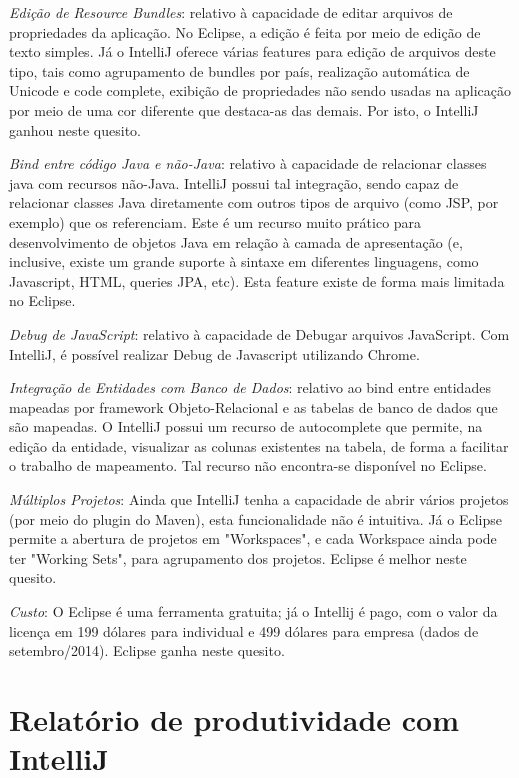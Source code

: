 \documentclass[12pt,journal,compsoc]{IEEEtran}
\begin{document}
\emph{Edição de Resource Bundles}: relativo à capacidade de editar arquivos de propriedades da aplicação. No Eclipse, a edição é feita por meio de edição de texto simples. Já o IntelliJ oferece várias features para edição de arquivos deste tipo, tais como agrupamento de bundles por país, realização automática de Unicode e code complete, exibição de propriedades não sendo usadas na aplicação por meio de uma cor diferente que destaca-as das demais. Por isto, o IntelliJ ganhou neste quesito.

\emph{Bind entre código Java e não-Java}: relativo à capacidade de relacionar classes java com recursos não-Java. IntelliJ possui tal integração, sendo capaz de relacionar classes Java diretamente com outros tipos de arquivo (como JSP, por exemplo) que os referenciam. Este é um recurso muito prático para desenvolvimento de objetos Java em relação à camada de apresentação (e, inclusive, existe um grande suporte à sintaxe em diferentes linguagens, como Javascript, HTML, queries JPA, etc\cite{dropped_eclipse}). Esta feature existe de forma mais limitada no Eclipse.

\emph{Debug de JavaScript}: relativo à capacidade de Debugar arquivos JavaScript. Com IntelliJ, é possível realizar Debug de Javascript utilizando Chrome.

\emph{Integração de Entidades com Banco de Dados}: relativo ao bind entre entidades mapeadas por framework Objeto-Relacional e as tabelas de banco de dados que são mapeadas. O IntelliJ possui um recurso de autocomplete que permite, na edição da entidade, visualizar as colunas existentes na tabela, de forma a facilitar o trabalho de mapeamento. Tal recurso não encontra-se disponível no Eclipse.

\emph{Múltiplos Projetos}: Ainda que IntelliJ tenha a capacidade de abrir vários projetos (por meio do plugin do Maven), esta funcionalidade não é intuitiva. Já o Eclipse permite a abertura de projetos em "Workspaces", e cada Workspace ainda pode ter "Working Sets", para agrupamento dos projetos. Eclipse é melhor neste quesito.

\emph{Custo}: O Eclipse é uma ferramenta gratuita; já o Intellij é pago, com o valor da licença em 199 dólares para individual e 499 dólares para empresa (dados de setembro/2014). Eclipse ganha neste quesito.

\section{Relatório de produtividade com IntelliJ}
\end{document}
